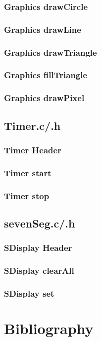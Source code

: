 \documentclass[a4paper,12pt]{article}
\begin{document}
\subsubsection{Graphics drawCircle}

\subsubsection{Graphics drawLine}

\subsubsection{Graphics drawTriangle}

\subsubsection{Graphics fillTriangle}

\subsubsection{Graphics drawPixel}

\subsection{Timer.c/.h}
\subsubsection{Timer Header}
\subsubsection{Timer start}
\subsubsection{Timer stop}

\subsection{sevenSeg.c/.h}
\subsubsection{SDisplay Header}
\subsubsection{SDisplay clearAll}
\subsubsection{SDisplay set}

\newpage
\section{Bibliography}
\end{document}
